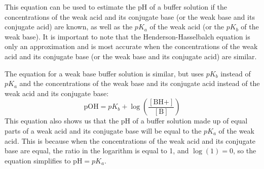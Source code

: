 This equation can be used to estimate the pH of a buffer solution if the concentrations of the weak acid and its conjugate base (or the weak base and its conjugate acid) are known, as well as the $pK_a$ of the weak acid (or the $pK_b$ of the weak base). It is important to note that the Henderson-Hasselbalch equation is only an approximation and is most accurate when the concentrations of the weak acid and its conjugate base (or the weak base and its conjugate acid) are similar.

The equation for a weak base buffer solution is similar, but uses $pK_b$ instead of $pK_a$ and the concentrations of the weak base and its conjugate acid instead of the weak acid and its conjugate base:
\begin{equation}\label{eq:Henderson_Hasselbalch_pOH}
    \text{pOH} = pK_b + \log \left( \frac{[\text{BH+}]}{[\text{B}]} \right)
\end{equation}
This equation also shows us that the pH of a buffer solution made up of equal parts of a weak acid and its conjugate base will be equal to the $pK_a$ of the weak acid. This is because when the concentrations of the weak acid and its conjugate base are equal, the ratio in the logarithm is equal to 1, and $\log(1) = 0$, so the equation simplifies to $\text{pH} = pK_a$.

